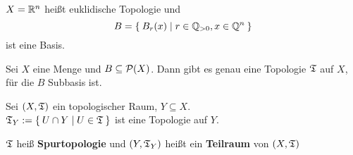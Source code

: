 \begin{beispiel}
    $X = \mathbb{R}^n$ heißt euklidische Topologie und
    \[B = \Set{B_r(x) | r \in \ensuremath{\mathbb{Q}}_{> 0}, x \in \ensuremath{\mathbb{Q}}^n}\]
    ist eine Basis.
\end{beispiel}

\begin{bemerkung}
    Sei $X$ eine Menge und $B \subseteq \mathcal{P}(X)$. Dann gibt es
    genau eine Topologie $\mathfrak{T}$ auf $X$, für die $B$ Subbasis ist.
\end{bemerkung}

\begin{definition}  
    Sei $(X, \mathfrak{T})$ ein topologischer Raum, $Y \subseteq X$.\\
    $\mathfrak{T}_Y := \Set{U \cap Y | U \in \mathfrak{T}}$ ist eine Topologie auf $Y$.

    $\mathfrak{T}$ heiß \textbf{Spurtopologie} und $(Y, \mathfrak{T}_Y)$ heißt ein 
    \textbf{Teilraum} von $(X, \mathfrak{T})$
\end{definition}
